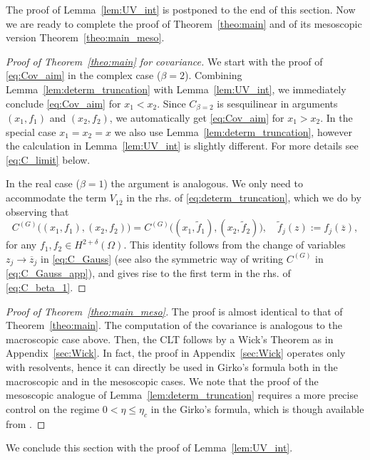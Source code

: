 \documentclass[10pt]{amsart}
\numberwithin{equation}{section}
\begin{document}
The proof of Lemma~\ref{lem:UV_int} is postponed to the end of this section. Now we are ready to complete the proof of Theorem~\ref{theo:main} and of its mesoscopic version Theorem~\ref{theo:main_meso}.

\begin{proof}[Proof of Theorem~\ref{theo:main} for covariance] We start with the proof of \eqref{eq:Cov_aim} in the complex case ($\beta=2$). Combining Lemma~\ref{lem:determ_truncation} with Lemma~\ref{lem:UV_int}, we immediately conclude \eqref{eq:Cov_aim} for $x_1<x_2$. Since $C_{\beta=2}$ is sesquilinear in arguments $(x_1,f_1)$ and $(x_2,f_2)$, we automatically get \eqref{eq:Cov_aim} for $x_1>x_2$. In the special case $x_1=x_2=x$ we also use Lemma~\ref{lem:determ_truncation}, however the calculation in Lemma~\ref{lem:UV_int} is slightly different. For more details see \eqref{eq:C_limit} below.

In the real case ($\beta=1$) the argument is analogous. We only need to accommodate the term $V_{1\overline{2}}$ in the rhs. of \eqref{eq:determ_truncation}, which we do by observing that
\begin{equation}
C^{(G)}\big((x_1,f_1),(x_2,f_2)\big) = C^{(G)}\big((x_1,\widetilde{f}_1),(x_2,\widetilde{f}_2)\big),\quad \widetilde{f}_j(z):=f_j(\overline{z}),
\end{equation}
for any $f_1,f_2\in H^{2+\delta}(\Omega)$. This identity follows from the change of variables $z_j\to \overline{z}_j$ in \eqref{eq:C_Gauss} (see also the symmetric way of writing $C^{(G)}$ in \eqref{eq:C_Gauss_app}), and gives rise to the first term in the rhs. of \eqref{eq:C_beta_1}.
\end{proof}


\begin{proof}[Proof of Theorem~\ref{theo:main_meso}] The proof is almost identical to that of Theorem~\ref{theo:main}. The computation of the covariance is analogous to the macroscopic case above. Then, the CLT follows by a Wick's Theorem as in Appendix~\ref{sec:Wick}. In fact, the proof in Appendix~\ref{sec:Wick} operates only with resolvents, hence it can directly be used in Girko's formula both in the macroscopic and in the mesoscopic cases. We note that the proof of the mesoscopic analogue of Lemma~\ref{lem:determ_truncation} requires a more precise control on the regime $0<\eta\le \eta_c$ in the Girko's formula, which is though available from \cite[Proposition~3.5]{Cipolloni_meso}.
\end{proof}


We conclude this section with the proof of Lemma~\ref{lem:UV_int}.
\end{document}

